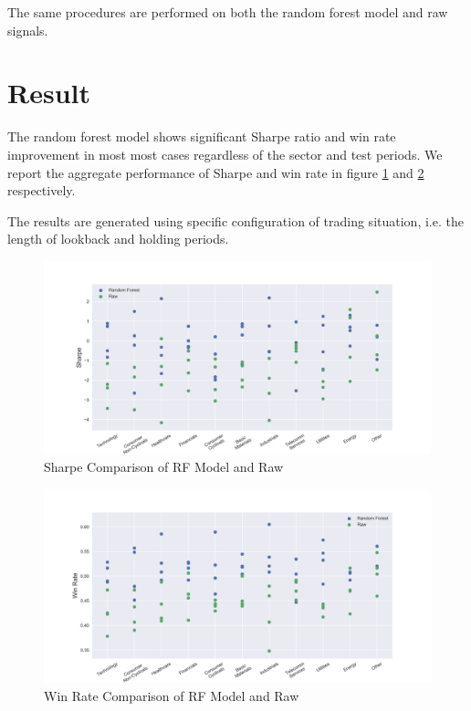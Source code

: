 \documentclass[12pt]{article}
\begin{document}
The same procedures are performed on both the random forest model and raw signals.


\section{Result}

The random forest model shows significant Sharpe ratio and win rate improvement in most most cases regardless of the sector and test periods. We report the aggregate performance of Sharpe and win rate in figure \ref{fig:rf_raw_sharpe} and \ref{fig:rf_raw_win_rate} respectively.

The results are generated using specific configuration of trading situation, i.e. the length of lookback and holding periods.

\begin{figure}[ht]
  \begin{center}
    \includegraphics[width=1\linewidth]{figure/rf_raw_sharpe.png}
  \end{center}
  \caption{Sharpe Comparison of RF Model and Raw}
  \label{fig:rf_raw_sharpe}
\end{figure}

\begin{figure}[!ht]
  \begin{center}
    \includegraphics[width=1\linewidth]{figure/rf_raw_win_rate.png}
  \end{center}
  \caption{Win Rate Comparison of RF Model and Raw}
  \label{fig:rf_raw_win_rate}
\end{figure}
\end{document}
